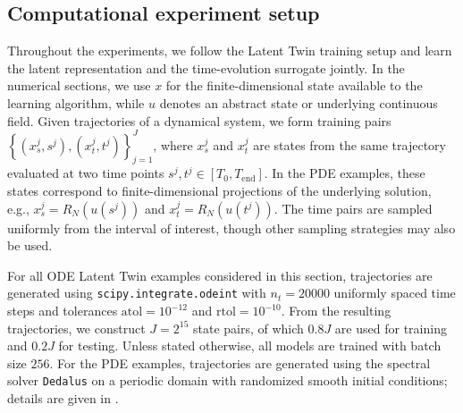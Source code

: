 \documentclass[a4paper,fleqn]{cas-sc}
\theoremstyle{thmstyleone}%
\theoremstyle{thmstyletwo}%
\theoremstyle{thmstylethree}%
\begin{document}
\subsection{Computational experiment setup}\label{sec:numsetup}

Throughout the experiments, we follow the Latent Twin training setup and learn the latent representation and the time-evolution surrogate jointly. In the numerical sections, we use $x$ for the finite-dimensional state available to the learning algorithm, while $u$ denotes an abstract state or underlying continuous field. Given trajectories of a dynamical system, we form training pairs $\left\{(x_s^j,s^j),(x_t^j,t^j) \right\}_{j=1}^J$, where $x_s^j$ and $x_t^j$ are states from the same trajectory evaluated at two time points $s^j,t^j\in[T_0,T_{\mathrm{end}}]$. In the PDE examples, these states correspond to finite-dimensional projections of the underlying solution, e.g., $x_s^j = R_N(u(s^j))$ and $x_t^j = R_N(u(t^j))$. The time pairs are sampled uniformly from the interval of interest, though other sampling strategies may also be used.

For all ODE Latent Twin examples considered in this section, trajectories are generated using \texttt{scipy.integrate.odeint} with $n_t=20000$ uniformly spaced time steps and tolerances $\mathrm{atol}=10^{-12}$ and $\mathrm{rtol}=10^{-10}$. From the resulting trajectories, we construct $J=2^{15}$ state pairs, of which $0.8J$ are used for training and $0.2J$ for testing. Unless stated otherwise, all models are trained with batch size $256$. For the PDE examples, trajectories are generated using the spectral solver \texttt{Dedalus} \cite{burns2020dedalus} on a periodic domain with randomized smooth initial conditions; details are given in .
\end{document}

